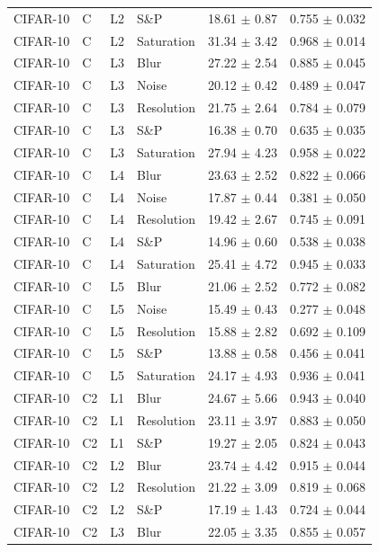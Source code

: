\begin{table}[htbp]
\begin{tabular}{llllrr}
CIFAR-10 & C & L2 & S\&P & 18.61 $\pm$ 0.87 & 0.755 $\pm$ 0.032 \\
CIFAR-10 & C & L2 & Saturation & 31.34 $\pm$ 3.42 & 0.968 $\pm$ 0.014 \\
CIFAR-10 & C & L3 & Blur & 27.22 $\pm$ 2.54 & 0.885 $\pm$ 0.045 \\
CIFAR-10 & C & L3 & Noise & 20.12 $\pm$ 0.42 & 0.489 $\pm$ 0.047 \\
CIFAR-10 & C & L3 & Resolution & 21.75 $\pm$ 2.64 & 0.784 $\pm$ 0.079 \\
CIFAR-10 & C & L3 & S\&P & 16.38 $\pm$ 0.70 & 0.635 $\pm$ 0.035 \\
CIFAR-10 & C & L3 & Saturation & 27.94 $\pm$ 4.23 & 0.958 $\pm$ 0.022 \\
CIFAR-10 & C & L4 & Blur & 23.63 $\pm$ 2.52 & 0.822 $\pm$ 0.066 \\
CIFAR-10 & C & L4 & Noise & 17.87 $\pm$ 0.44 & 0.381 $\pm$ 0.050 \\
CIFAR-10 & C & L4 & Resolution & 19.42 $\pm$ 2.67 & 0.745 $\pm$ 0.091 \\
CIFAR-10 & C & L4 & S\&P & 14.96 $\pm$ 0.60 & 0.538 $\pm$ 0.038 \\
CIFAR-10 & C & L4 & Saturation & 25.41 $\pm$ 4.72 & 0.945 $\pm$ 0.033 \\
CIFAR-10 & C & L5 & Blur & 21.06 $\pm$ 2.52 & 0.772 $\pm$ 0.082 \\
CIFAR-10 & C & L5 & Noise & 15.49 $\pm$ 0.43 & 0.277 $\pm$ 0.048 \\
CIFAR-10 & C & L5 & Resolution & 15.88 $\pm$ 2.82 & 0.692 $\pm$ 0.109 \\
CIFAR-10 & C & L5 & S\&P & 13.88 $\pm$ 0.58 & 0.456 $\pm$ 0.041 \\
CIFAR-10 & C & L5 & Saturation & 24.17 $\pm$ 4.93 & 0.936 $\pm$ 0.041 \\
CIFAR-10 & C2 & L1 & Blur & 24.67 $\pm$ 5.66 & 0.943 $\pm$ 0.040 \\
CIFAR-10 & C2 & L1 & Resolution & 23.11 $\pm$ 3.97 & 0.883 $\pm$ 0.050 \\
CIFAR-10 & C2 & L1 & S\&P & 19.27 $\pm$ 2.05 & 0.824 $\pm$ 0.043 \\
CIFAR-10 & C2 & L2 & Blur & 23.74 $\pm$ 4.42 & 0.915 $\pm$ 0.044 \\
CIFAR-10 & C2 & L2 & Resolution & 21.22 $\pm$ 3.09 & 0.819 $\pm$ 0.068 \\
CIFAR-10 & C2 & L2 & S\&P & 17.19 $\pm$ 1.43 & 0.724 $\pm$ 0.044 \\
CIFAR-10 & C2 & L3 & Blur & 22.05 $\pm$ 3.35 & 0.855 $\pm$ 0.057 \\

\end{tabular}
\end{table}
